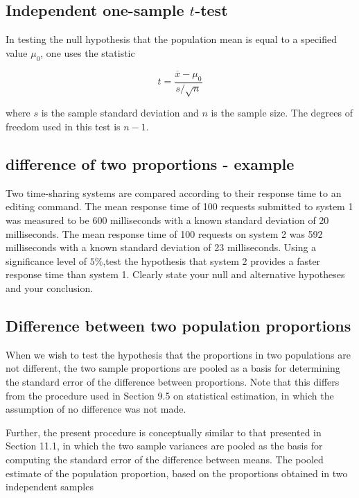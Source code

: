 \documentclass[14pt, a4paper]{article}
\theoremstyle{plain}
\theoremstyle{definition}
\theoremstyle{remark}
\begin{document}
\subsection{Independent one-sample $t$-test}
In testing the null hypothesis that the population mean is equal to a specified value $\mu_{0}$, one uses the statistic

\begin{equation}t = \frac{\overline{x} - \mu_0}{s / \sqrt{n}}\end{equation}

where $s$ is the sample standard deviation and $n$ is the sample size. The degrees of freedom used in this test is $n - 1$.

\subsection{difference of two proportions - example}
Two time-sharing systems are compared according to their response time to an editing command. The mean response time of 100 requests submitted to system 1 was measured to be 600 milliseconds with a
known standard deviation of 20 milliseconds. The mean response time
of 100 requests on system 2 was 592 milliseconds with a known standard deviation of 23 milliseconds. Using a significance level of $5\%$,test the hypothesis that system 2 provides a faster response time than
system 1. Clearly state your null and alternative hypotheses and your conclusion.







\subsection{Difference between two population proportions}
When we wish to test the hypothesis that the proportions in two
populations are not different, the two sample proportions are
pooled as a basis for determining the standard error of the
difference between proportions. Note that this differs from the
procedure used in Section 9.5 on statistical estimation, in which
the assumption of no difference was not made.

Further, the present procedure is conceptually similar to that
presented in Section 11.1, in which the two sample variances are
pooled as the basis for computing the standard error of the
difference between means. The pooled estimate of the population
proportion, based on the proportions obtained in two independent
samples
\end{document}
